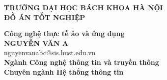 \documentclass[DoAn.tex]{subfiles}
\begin{document}
\begin{titlepage}
\thispagestyle{empty}
\begin{center}

{\textbf{\large{TRƯỜNG ĐẠI HỌC BÁCH KHOA HÀ NỘI}}}\\[4cm]

{\textbf{\huge{ ĐỒ ÁN TỐT NGHIỆP}}}\\[1cm]
{\textbf{\Large{Công nghệ thực tế ảo và ứng dụng}}\\[1cm]

{\textbf{\large{NGUYỄN VĂN A}}}\\
{\large{nguyenvanabc@sis.hust.edu.vn}}\\[0.5cm]

{\textbf{\large{Ngành Công nghệ thông tin và truyền thông}}}\\
{\textbf{\large{Chuyên ngành Hệ thống thông tin}}}\\

\vspace{2cm}
\begin{table}[H]
\centering
{}
\end{table}}
\end{center}



\end{titlepage}
\end{document}
